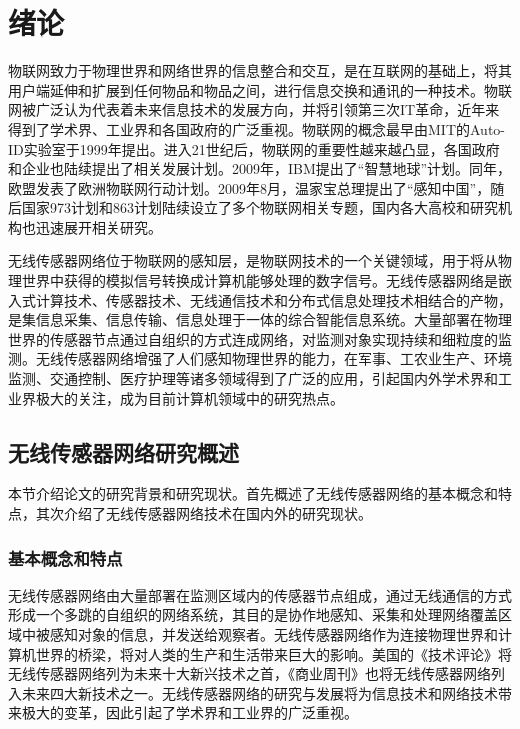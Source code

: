 \chapter{绪论}
\label{chap:1}
物联网致力于物理世界和网络世界的信息整合和交互，是在互联网的基础上，将其用户端延伸和扩展到任何物品和物品之间，进行信息交换和通讯的一种技术。物联网被广泛认为代表着未来信息技术的发展方向，并将引领第三次IT革命，近年来得到了学术界、工业界和各国政府的广泛重视。物联网的概念最早由MIT的Auto-ID实验室于1999年提出。进入21世纪后，物联网的重要性越来越凸显，各国政府和企业也陆续提出了相关发展计划。2009年，IBM提出了“智慧地球”计划。同年，欧盟发表了欧洲物联网行动计划。2009年8月，温家宝总理提出了“感知中国”，随后国家973计划和863计划陆续设立了多个物联网相关专题，国内各大高校和研究机构也迅速展开相关研究。

无线传感器网络位于物联网的感知层，是物联网技术的一个关键领域，用于将从物理世界中获得的模拟信号转换成计算机能够处理的数字信号。无线传感器网络是嵌入式计算技术、传感器技术、无线通信技术和分布式信息处理技术相结合的产物，是集信息采集、信息传输、信息处理于一体的综合智能信息系统。大量部署在物理世界的传感器节点通过自组织的方式连成网络，对监测对象实现持续和细粒度的监测。无线传感器网络增强了人们感知物理世界的能力，在军事、工农业生产、环境监测、交通控制、医疗护理等诸多领域得到了广泛的应用，引起国内外学术界和工业界极大的关注，成为目前计算机领域中的研究热点。

\section{无线传感器网络研究概述}
本节介绍论文的研究背景和研究现状。首先概述了无线传感器网络的基本概念和特点，其次介绍了无线传感器网络技术在国内外的研究现状。
\subsection{基本概念和特点}
无线传感器网络由大量部署在监测区域内的传感器节点组成，通过无线通信的方式形成一个多跳的自组织的网络系统，其目的是协作地感知、采集和处理网络覆盖区域中被感知对象的信息，并发送给观察者。无线传感器网络作为连接物理世界和计算机世界的桥梁，将对人类的生产和生活带来巨大的影响。美国的《技术评论》将无线传感器网络列为未来十大新兴技术之首，《商业周刊》也将无线传感器网络列入未来四大新技术之一。无线传感器网络的研究与发展将为信息技术和网络技术带来极大的变革，因此引起了学术界和工业界的广泛重视。

